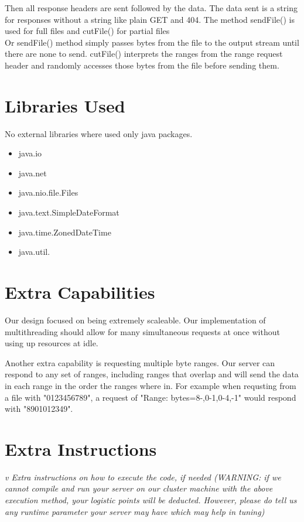 \documentclass[11pt, letterpaper]{report}
\begin{document}
Then all response headers are sent followed by the data. The data sent is a string for responses without a string like plain GET and 404. The method sendFile() is used for full files and cutFile() for partial files \\

Or sendFile() method simply passes bytes from the file to the output stream until there are none to send. cutFile() interprets the ranges from the range request header and randomly accesses those bytes from the file before sending them.
\section{Libraries Used}
No external libraries where used only java packages.
\begin{itemize}
    \item java.io
    \item java.net
    \item java.nio.file.Files
    \item java.text.SimpleDateFormat
    \item java.time.ZonedDateTime
    \item java.util.
\end{itemize}

\section{Extra Capabilities}
Our design focused on being extremely scaleable. Our implementation of multithreading should allow for many simultaneous requests at once without using up resources at idle. 

Another extra capability is requesting multiple byte ranges. Our server can respond to any set of ranges, including ranges that overlap and will send the data in each range in the order the ranges where in. For example when requsting from a file with "0123456789", a request of "Range: bytes=8-,0-1,0-4,-1" would respond with "8901012349".

\section{Extra Instructions}
\textit{v Extra instructions on how to execute the code, if needed (WARNING: if we cannot compile and run your server on our cluster machine with the above execution method, your logistic points will be deducted. However, please do tell us any runtime parameter your server may have which may help in tuning)}
\end{document}
